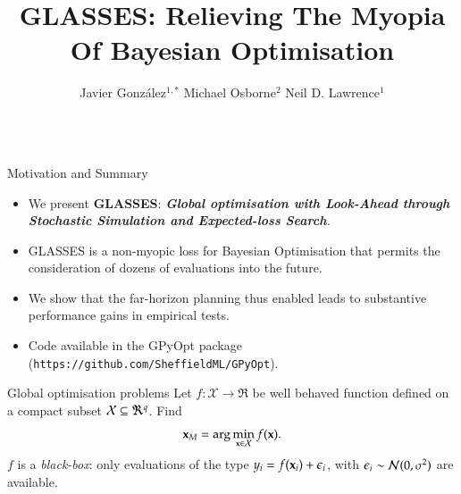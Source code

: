 \documentclass[15pt,serif,mathserif,final]{beamer}
\title{\Huge{GLASSES: Relieving The Myopia Of Bayesian Optimisation}}
\author{Javier Gonz\'{a}lez$^{1,*}$ \quad Michael Osborne$^{2}$ \quad  Neil D. Lawrence$^{1}$}
\institute{$^1$University of Sheffield, $^2$University of Oxford}
\begin{document}
\begin{frame}{}
  \begin{columns}[t]

    \begin{column}{0.32\linewidth}

      \begin{block}{Motivation and Summary}





\begin{itemize}
\item We present \textcolor{mycolor}{\textbf{GLASSES}}: \emph{\textbf{Global optimisation with Look-Ahead through Stochastic Simulation and Expected-loss Search}.} 
\item GLASSES is a \textcolor{mycolor}{non-myopic loss for Bayesian Optimisation} that permits the consideration of dozens of evaluations into the future.
\item We show that \textcolor{mycolor}{the far-horizon planning thus enabled leads to substantive performance gains} in empirical tests. 
\item Code available in the \textcolor{mycolor}{GPyOpt} package (\texttt{https://github.com/SheffieldML/GPyOpt}).
\end{itemize}
      \end{block}

      
\begin{block}{Global optimisation problems}
Let $f: {\mathcal X} \to \Re$ be well behaved function defined on a compact subset ${\mathcal X} \subseteq \Re^{q}$. Find 
$$\mathbf{x}_{M} = \arg \min_{\mathbf{x} \in {\mathcal X}} f(\mathbf{x}).$$ 
\textcolor{mycolor}{$f$ is a \emph{black-box}}: only evaluations of the type $y_i = f(\mathbf{x}_i) + \epsilon_i$, with $\epsilon_i \sim\mathcal{N}(0,\sigma^2)$ are  available.
\end{block}      
      
\end{column}
\end{columns}
\end{frame}
\end{document}
